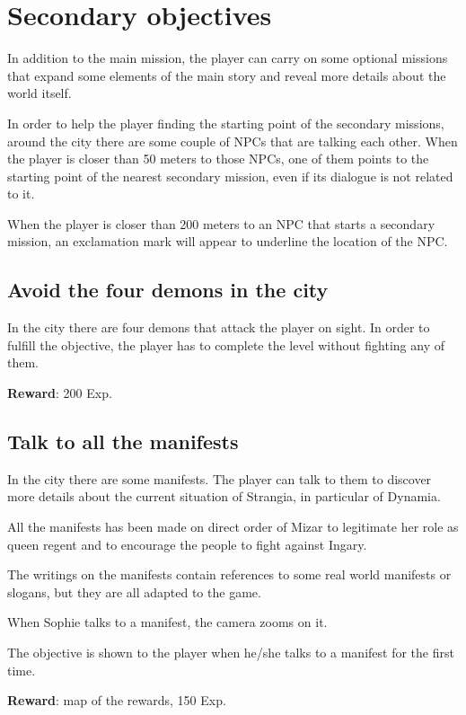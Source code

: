 \section{Secondary objectives}
In addition to the main mission, the player can carry on some optional missions that expand some elements of the main story and reveal more details about the world itself.

In order to help the player finding the starting point of the secondary missions, around the city there are some couple of NPCs that are talking each other. When the player is closer than 50 meters to those NPCs, one of them points to the starting point of the nearest secondary mission, even if its dialogue is not related to it.

When the player is closer than 200 meters to an NPC that starts a secondary mission, an exclamation mark will appear to underline the location of the NPC.

\subsection{Avoid the four demons in the city}
In the city there are four demons that attack the player on sight. In order to fulfill the objective, the player has to complete the level without fighting any of them.

\textbf{Reward}: 200 Exp.

\subsection{Talk to all the manifests}
In the city there are some manifests. The player can talk to them to discover more details about the current situation of Strangia, in particular of Dynamia.

All the manifests has been made on direct order of Mizar to legitimate her role as queen regent and to encourage the people to fight against Ingary.

The writings on the manifests contain references to some real world manifests or slogans, but they are all adapted to the game.

When Sophie talks to a manifest, the camera zooms on it.

The objective is shown to the player when he/she talks to a manifest for the first time.

\textbf{Reward}: map of the rewards, 150 Exp.

